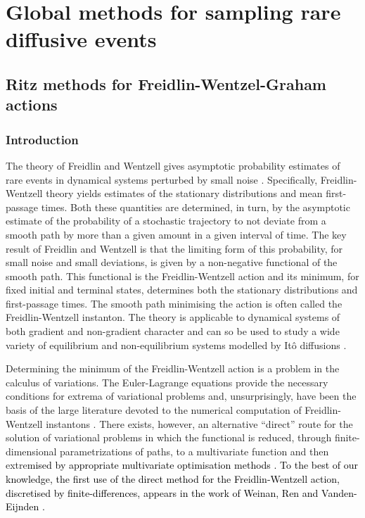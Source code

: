 \part{Global methods for sampling rare diffusive events}

\chapter{Ritz methods for Freidlin-Wentzel-Graham actions} \label{ch:Ritz methods for Freidlin-Wentzel-Graham actions}

\section{Introduction}

The theory of Freidlin and Wentzell \citep{ventsel1970small}
gives asymptotic probability estimates of rare events in dynamical
systems perturbed by small noise \citep{bolhuis2002transition, allen2005sampling, allen2009forward, ebener2019instanton}.
Specifically, Freidlin-Wentzell theory yields estimates of the stationary
distributions and mean first-passage times. Both these quantities
are determined, in turn, by the asymptotic estimate of the probability
of a stochastic trajectory to not deviate from a smooth path by more
than a given amount in a given interval of time. The key result of
Freidlin and Wentzell is that the limiting form of this probability,
for small noise and small deviations, is given by a non-negative functional
of the smooth path. This functional is the Freidlin-Wentzell action
and its minimum, for fixed initial and terminal states, determines
both the stationary distributions and first-passage times. The smooth
path minimising the action is often called the Freidlin-Wentzell instanton.
The theory is applicable to dynamical systems of both gradient and
non-gradient character and can so be used to study a wide variety
of equilibrium and non-equilibrium systems modelled by Itô diffusions
\citep{paninski2006most,huang2012molecular, bouchet2016generalisation, maier1996scaling, wolynes1995navigating, nolting2016balls, mangel1994barrier, gardner2000construction, demarco2001phase, nelson1987stochastic}.

Determining the minimum of the Freidlin-Wentzell action is a problem
in the calculus of variations. The Euler-Lagrange equations provide
the necessary conditions for extrema of variational problems and,
unsurprisingly, have been the basis of the large literature devoted
to the numerical computation of Freidlin-Wentzell instantons \citep{weinan2002string,paninski2006most,heymann2008geometric,grafke2017long}.
There exists, however, an alternative ``direct'' route for the solution
of variational problems in which the functional is reduced, through
finite-dimensional parametrizations of paths, to a multivariate function
and then extre\textcolor{black}{mised by appropriate multivariate
optimisation methods \citep{gelfand2012calculus,kantorovich1958approximate}.
To the best of our knowledge, the first use of the direct method for
the Freidlin-Wentzell action, discretised by finite-differences, appears
in the work of Weinan, Ren and Vanden-Eijnden \citep{weinan2004minimum}.} 

